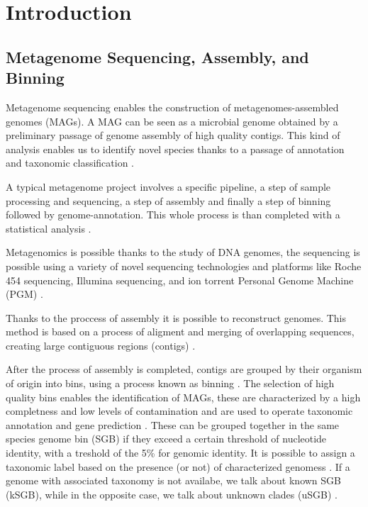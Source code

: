 \documentclass[a4paper,titlepage]{book}
\begin{document}
\begin{frontespizio}
\Istituzione{}
\Punteggiatura{}
\end{frontespizio}

\tableofcontents

\chapter{Introduction}



\section{Metagenome Sequencing, Assembly, and Binning}
Metagenome sequencing enables the construction of metagenomes-assembled genomes (MAGs). A MAG can be seen as a microbial genome obtained by a preliminary passage of genome assembly of high quality contigs. This kind of analysis enables us to identify novel species thanks to a passage of annotation and taxonomic classification \cite{MAG}.

A typical metagenome project involves a specific pipeline, a step of sample processing and sequencing, a step of assembly and finally a step of binning followed by genome-annotation. This whole process is than completed with a statistical analysis \cite{Metagenome}.

Metagenomics is possible thanks to the study of DNA genomes, the sequencing is possible using a variety of novel sequencing technologies and platforms like Roche 454 sequencing, Illumina sequencing, and ion torrent Personal Genome Machine (PGM) \cite{Sequencing}.

Thanks to the proccess of assembly it is possible to reconstruct genomes. This method is based on a process of aligment and merging of overlapping sequences, creating large contiguous regions (contigs) \cite{Assembly}.

After the process of assembly is completed, contigs are grouped by their organism of origin into bins, using a process known as binning \cite{Binning}. The selection of high quality bins enables the identification of MAGs, these are characterized by a high completness and low levels of contamination and are used to operate taxonomic annotation and gene prediction \cite{MAG2}. These can be grouped together in the same species genome bin (SGB) if they exceed a certain threshold of nucleotide identity, with a treshold of the 5\% for genomic identity. It is possible to assign a taxonomic label based on the presence (or not) of characterized genomess \cite{SGB2}. If a genome with associated taxonomy is not availabe, we talk about known SGB (kSGB), while in the opposite case, we talk about unknown clades (uSGB) \cite{SGB}.
\end{document}
